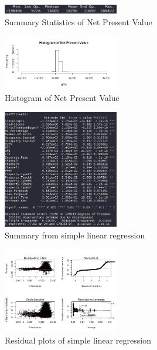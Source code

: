 \documentclass[10pt,twocolumn,letterpaper]{article}
\begin{document}
\begin{figure}
	\includegraphics[width=0.45\textwidth]{images/NPVS.JPG}
	\caption{Summary Statistics of Net Present Value}
	\label{fig:NPVS}
\end{figure}
\begin{figure}
	\includegraphics[width=0.45\textwidth]{images/NPVB.jpeg}
	\caption{Histogram of Net Present Value}
	\label{fig:NPVB}
\end{figure}


\begin{figure}
	\includegraphics[width=0.45\textwidth]{images/lm1s.jpg}
	\caption{Summary from simple linear regression}
	\label{fig:lm1s}
\end{figure}

\begin{figure}
	\includegraphics[width=0.45\textwidth]{images/lm1.jpeg}
	\caption{Residual plots of simple linear regression}
	\label{fig:lm1c}
\end{figure}
\end{document}

